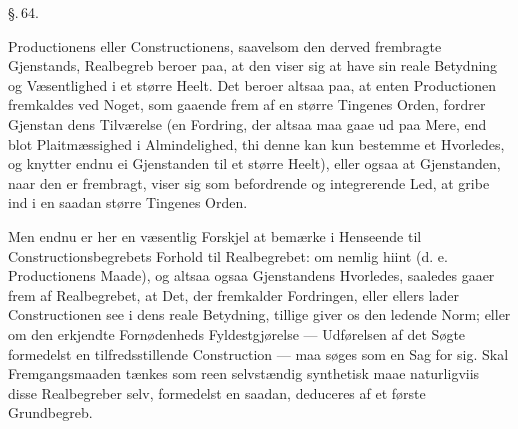 \documentclass[12pt]{book}
\def\textit#1{#1}%
\newcommand{\parag}[1]{%
  \par\vspace{0.9\baselineskip}%
  {\centering\textit{\S.\,#1.}\par}%
  \vspace{0.35\baselineskip}%
  \noindent\hspace{\parindent}\ignorespaces
}
\newcommand{\opage}[1]{\marginnote{\footnotesize\textit{[#1]}}}
\begin{document}
\parag{64}

Productionens eller Constructionens, saavelsom den derved frembragte
Gjenstands, Realbegreb beroer paa, at den viser sig at have sin reale Betydning
og Væsentlighed i et større Heelt. Det beroer altsaa paa, at enten Productionen
fremkaldes ved Noget, som gaaende frem af en større Tingenes Orden, fordrer
Gjenstan%
\opage{169}dens Tilværelse (en Fordring, der altsaa maa gaae ud paa Mere, end blot
Plaitmæssighed i Almindelighed, thi denne kan kun bestemme et Hvorledes, og
knytter endnu ei Gjenstanden til et større Heelt), eller ogsaa at Gjenstanden,
naar den er frembragt, viser sig som befordrende og integrerende Led, at gribe
ind i en saadan større Tingenes Orden.

Men endnu er her en væsentlig Forskjel at bemærke i Henseende til
Constructionsbegrebets Forhold til Realbegrebet: om nemlig hiint (d. e.
Productionens Maade), og altsaa ogsaa Gjenstandens Hvorledes, saaledes gaaer
frem af Realbegrebet, at Det, der fremkalder Fordringen, eller ellers lader
Constructionen see i dens reale Betydning, tillige giver os den ledende Norm;
eller om den erkjendte Fornødenheds Fyldestgjørelse --- Udførelsen af det Søgte
formedelst en tilfredsstillende Construction --- maa søges som en Sag for sig.
Skal Fremgangsmaaden tænkes som reen selvstændig synthetisk maae naturligviis
disse Realbegreber selv, formedelst en saadan, deduceres af et første
Grundbegreb.
\end{document}
